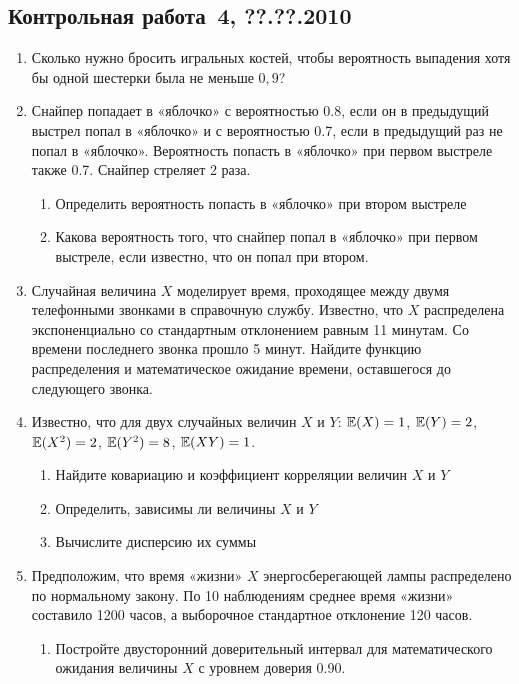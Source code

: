 \documentclass[pdftex,12pt,a4paper]{article}
\begin{document}
\subsection{Контрольная работа \No\,4, ??.??.2010}

\begin{enumerate}

\item Сколько нужно бросить игральных костей, чтобы вероятность выпадения хотя бы одной шестерки была не меньше $0{,}9$?
\item Снайпер попадает в «яблочко» с вероятностью 0.8, если он в предыдущий выстрел попал в «яблочко» и с вероятностью 0.7, если в предыдущий раз не попал в  «яблочко». Вероятность попасть в «яблочко» при первом выстреле также 0.7. Снайпер стреляет 2 раза.
\begin{enumerate}
\item Определить вероятность попасть в «яблочко» при втором выстреле
\item Какова вероятность того, что снайпер попал в «яблочко» при первом выстреле, если известно, что он попал при втором. 
\end{enumerate}
\item Случайная величина $X$ моделирует время, проходящее между двумя телефонными звонками в справочную службу. Известно, что $X$ распределена экспоненциально со стандартным отклонением равным 11 минутам. Со времени последнего звонка прошло 5 минут. Найдите функцию распределения и математическое ожидание времени, оставшегося до следующего звонка.
\item Известно, что для двух случайных величин $X$ и $Y$: $\mathbb{E}(X)=1$, $\mathbb{E}(Y)=2$, $\mathbb{E}(X^2)=2$, $\mathbb{E}(Y^2)=8$, $\mathbb{E}(XY)=1$. 
\begin{enumerate}
\item Найдите ковариацию и коэффициент корреляции величин $X$ и $Y$
\item Определить, зависимы ли величины $X$ и $Y$
\item Вычислите дисперсию их суммы
\end{enumerate}
\item Предположим, что время «жизни» $X$ энергосберегающей лампы распределено по нормальному закону. По 10 наблюдениям среднее время «жизни» составило 1200 часов, а выборочное стандартное отклонение 120 часов. 
\begin{enumerate}
\item Постройте двусторонний доверительный интервал для математического ожидания величины $X$ с уровнем доверия 0.90.

\end{enumerate}
\end{enumerate}
\end{document}
